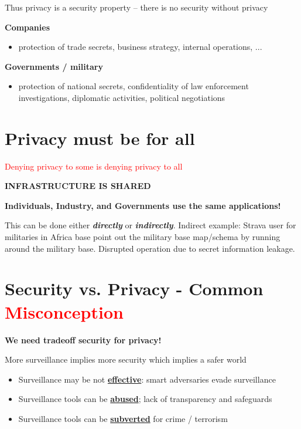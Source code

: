 \documentclass[11pt]{article}
\begin{document}
Thus privacy is a security property -- there is no security without privacy

\textbf{Companies}
\begin{itemize}
	\item protection of trade secrets, business strategy, internal operations, ...
\end{itemize}
\textbf{Governments / military}
\begin{itemize}
	\item protection of national secrets, confidentiality of law enforcement investigations, diplomatic activities, political negotiations

\end{itemize}

\section*{Privacy must be for all}

\textcolor{red}{Denying privacy to some is denying privacy to all}

\textbf{INFRASTRUCTURE IS SHARED}

\textbf{Individuals, Industry, and Governments use the same applications!}

This can be done either \textbf{\textit{directly}} or \textbf{\textit{indirectly}}. Indirect example: Strava user for militaries in Africa base point out the military base map/schema by running around the military base. Disrupted operation due to secret information leakage. 

\section*{Security vs. Privacy - Common \textcolor{red}{Misconception}}

\textbf{We need tradeoff security for privacy!}

\begin{center}
	More surveillance implies more security which implies a safer world
\end{center}

\begin{itemize}
	\item Surveillance may be not \textbf{\underline{effective}}: smart adversaries evade surveillance
	\item Surveillance tools can be \underline{\textbf{abused}}; lack of transparency and safeguards
	\item Surveillance tools can be \textbf{\underline{subverted}} for crime / terrorism
\end{itemize}
\end{document}
